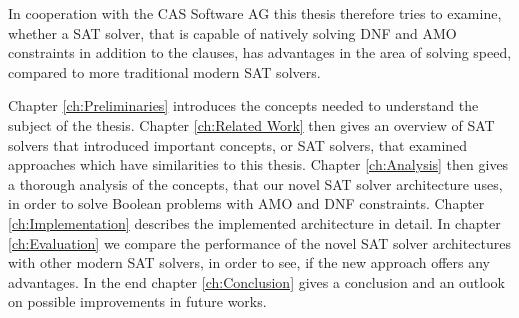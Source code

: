 In cooperation with the CAS Software AG this thesis therefore tries to examine, whether a SAT solver, that is capable of natively solving DNF and AMO constraints in addition to the clauses, has advantages in the area of solving speed, compared to more traditional modern SAT solvers.

Chapter \ref{ch:Preliminaries} introduces the concepts needed to understand the subject of the thesis. Chapter \ref{ch:Related Work} then gives an overview of SAT solvers that introduced important concepts, or SAT solvers, that examined approaches which have similarities to this thesis. Chapter \ref{ch:Analysis} then gives a thorough analysis of the concepts, that our novel SAT solver architecture uses, in order to solve Boolean problems with AMO and DNF constraints. Chapter \ref{ch:Implementation} describes the implemented architecture in detail. In chapter \ref{ch:Evaluation} we compare the performance of the novel SAT solver architectures with other modern SAT solvers, in order to see, if the new approach offers any advantages. In the end chapter \ref{ch:Conclusion} gives a conclusion and an outlook on possible improvements in future works.

